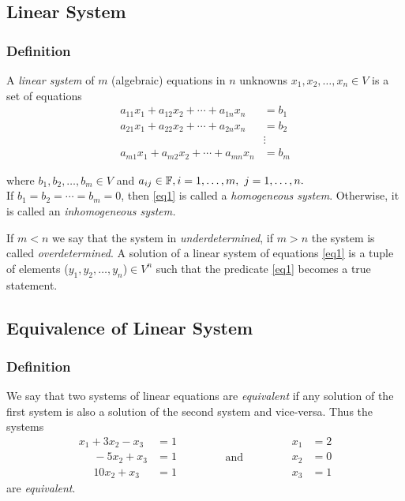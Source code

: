 \documentclass{beamer}
\renewcommand{\emph}[1]{{\color{Turquoise3}\textsl{#1}}}
\newcommand{\myseries}[2]{$#1_1,#1_2,\dots,#1_#2$}
\begin{document}
\subsection{Linear System}
\begin{frame}
    \frametitle{Definition}

    A \emph{linear system} of $m$ (algebraic) equations in $n$ unknowns \myseries{x}{n}$\in V$ is a set of equations
    \begin{equation}
        \begin{aligned}
            a_{11}x_1+a_{12}x_2+\cdots+a_{1n}x_n & =b_1   \\
            a_{21}x_1+a_{22}x_2+\cdots+a_{2n}x_n & =b_2   \\
                                                 & \vdots \\
            a_{m1}x_1+a_{m2}x_2+\cdots+a_{mn}x_n & =b_m
        \end{aligned}
        \label{eq1}
    \end{equation}

    where \myseries{b}{m}$\in V$ and $a_{ij}\in\mathbb{F},i=1,\ldots,m,~j=1,\ldots,n.$\\
    If $b_1=b_2=\cdots=b_m=0$, then \eqref{eq1} is called a \emph{homogeneous system}. Otherwise, it is called an \emph{inhomogeneous system.}

    If $m<n$ we say that the system in \emph{underdetermined}, if $m>n$ the system is called \emph{overdetermined}.
    A solution of a linear system of equations \eqref{eq1} is a tuple of elements (\myseries{y}{n})$\in V^n$ such that the predicate \eqref{eq1} becomes a true statement.\\[3pt]
\end{frame}

\subsection{Equivalence of Linear System}
\begin{frame}
    \frametitle{Definition}
    We say that two systems of linear equations are \emph{equivalent} if any solution
    of the first system is also a solution of the second system and vice-versa.
    Thus the systems
    \begin{equation*}
        \begin{aligned}
            x_1+3x_2-x_3    & =1 \\
            ~~~~~~-5x_2+x_3 & =1 \\
            ~~~~~~10x_2+x_3 & =1
        \end{aligned}
        \qquad\qquad\text{and}\qquad\qquad
        \begin{aligned}
            x_1 & =2 \\x_2&=0\\x_3&=1
        \end{aligned}
    \end{equation*} are \emph{equivalent}.
\end{frame}
\end{document}
